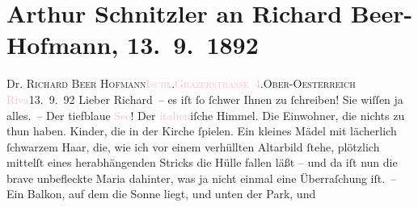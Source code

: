 

               \section[Arthur Schnitzler an Richard Beer-Hofmann, 13. 9. 1892]{ Arthur Schnitzler an Richard Beer-Hofmann, 13. 9. 1892}\nopagebreak{}\rehead{ }\normalsize\beginnumbering{} \toendnotes[C]{\smallbreak\pagebreak[2]} 
\toendnotes[C]{\smallbreak}\pstart{}{\pb}Dr. \textsc{Richard Beer Hofmann}\pend{}\pstart{}\textsc{\textcolor{pink}{Ischl}{}\ledrightnote{\textcolor{pink}{Bad Ischl}}.}\pend{}\pstart{}\textsc{\textcolor{pink}{Grazerstraße 4}{}\ledrightnote{\textcolor{pink}{Grazer Straße}}}.\pend{}\pstart{}\textsc{Ober-Oesterreich}\pend{}{\bigskip}\pstart
           \raggedleft{}{\pb}\textcolor{pink}{Riva}{}\ledrightnote{\textcolor{pink}{Riva del Garda}}{ }13. 9. 92\pend
           \pstart
           Lieber Richard – es iſt ſo ſchwer Ihnen zu ſchreiben! Sie wiſſen ja
               alles. – Der tiefblaue \textcolor{pink}{See}{}! Der \textcolor{pink}{italien}{}\ledrightnote{\textcolor{pink}{Italien}}iſche
               Himmel. Die Einwohner, die nichts zu thun haben. Kinder, die in der Kirche ſpielen.
               Ein kleines Mädel mit lächerlich ſchwarzem Haar, die, wie ich vor einem verhüllten
               Altarbild ſtehe, plötzlich mittelſt eines herabhängenden Stricks die Hülle fallen
               läßt – und da iſt nun die brave unbefleckte Maria dahinter, was ja nicht einmal eine
               Überraſchung iſt. – Ein Balkon, auf dem die Sonne liegt, und unten der Park, und
